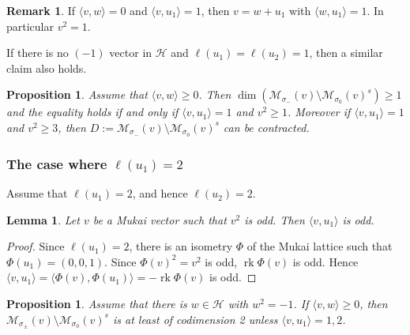 \documentclass[leqno,11pt]{amsart}
\def\dim{\mathop{\mathrm{dim}}\nolimits}
\def\rk{\mathop{\mathrm{rk}}}
\newtheorem{Prop}[Thm]{Proposition}
\newtheorem{Lem}[Thm]{Lemma}
\theoremstyle{definition}
\newtheorem{Rem}[Thm]{Remark}
\def\HH{\ensuremath{\mathcal H}}
\def\MM{\ensuremath{\mathcal M}}
\begin{document}
\begin{Rem}
If $\langle v,w \rangle=0$ and $\langle v,u_1 \rangle=1$, then
$v=w+u_1$ with $\langle w,u_1 \rangle=1$. In particular $v^2=1$.
\end{Rem}





If there is no $(-1)$ vector in $\HH$ and $\ell(u_1)=\ell(u_2)=1$, then
a similar claim also holds.

\begin{Prop}
Assume that $\langle v,w \rangle \geq 0$.
Then $\dim(\MM_{\sigma_-}(v) \setminus \MM_{\sigma_0}(v)^s) \geq 1$
and the equality holds if and only if 
$\langle v,u_1 \rangle=1$ and $v^2 \geq 1$.
Moreover if $\langle v,u_1 \rangle=1$ and $v^2 \geq 3$, then
$D:=\MM_{\sigma_-}(v) \setminus \MM_{\sigma_0}(v)^s$
can be contracted.
\end{Prop}


\subsubsection{The case where $\ell(u_1)=2$}
Assume that $\ell(u_1)=2$, and hence
 $\ell(u_2)=2$.
\begin{Lem}\label{Lem:FM:rank}
Let $v$ be a Mukai vector such that $v^2$ is odd.
Then  
$\langle v, u_1 \rangle$ is odd.
\end{Lem}

\begin{proof}
Since $\ell(u_1)=2$, there is an isometry $\Phi$ of the Mukai lattice 
such that $\Phi(u_1)=(0,0,1)$.
Since $\Phi(v)^2=v^2$ is odd, $\rk \Phi(v)$ is odd.
Hence $\langle v,u_1 \rangle=\langle \Phi(v),\Phi(u_1) \rangle=-\rk \Phi(v)$
is odd. 
\end{proof}



\begin{Prop}
Assume that there is $w \in \HH$ with $w^2=-1$.
If $\langle v,w \rangle \geq 0$,
then $\MM_{\sigma_\pm}(v) \setminus \MM_{\sigma_0}(v)^s$
is at least of codimension 2 unless
$\langle v, u_1 \rangle=1,2$. 
\end{Prop}
\end{document}
